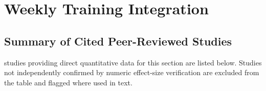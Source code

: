 \section{Weekly Training Integration}
\label{sec:weekly}

\subsection{Summary of Cited Peer-Reviewed Studies}
\label{subsec:weekly_table}

\noindent\textbf{\evidencebacked} studies providing direct quantitative data for this section are listed below. Studies not independently confirmed by numeric effect-size verification are excluded from the table and flagged where used in text.

